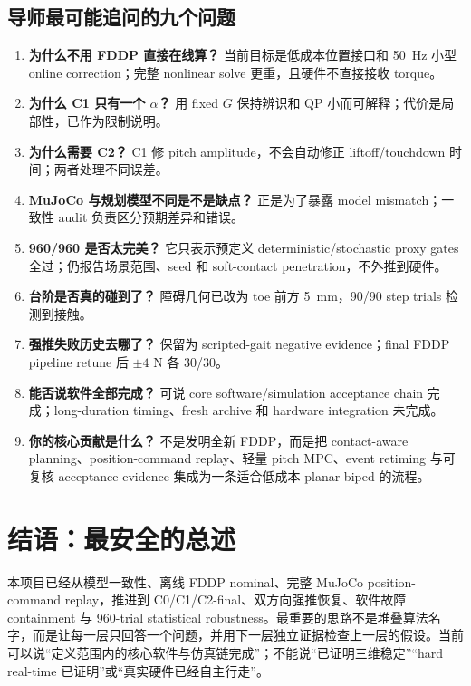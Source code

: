\documentclass[UTF8,11pt,a4paper]{ctexart}
\begin{document}
\subsection{导师最可能追问的九个问题}

\begin{enumerate}
 \item \textbf{为什么不用 FDDP 直接在线算？} 当前目标是低成本位置接口和 \SI{50}{Hz} 小型 online correction；完整 nonlinear solve 更重，且硬件不直接接收 torque。
 \item \textbf{为什么 C1 只有一个 $\alpha$？} 用 fixed $G$ 保持辨识和 QP 小而可解释；代价是局部性，已作为限制说明。
 \item \textbf{为什么需要 C2？} C1 修 pitch amplitude，不会自动修正 liftoff/touchdown 时间；两者处理不同误差。
 \item \textbf{MuJoCo 与规划模型不同是不是缺点？} 正是为了暴露 model mismatch；一致性 audit 负责区分预期差异和错误。
 \item \textbf{960/960 是否太完美？} 它只表示预定义 deterministic/stochastic proxy gates 全过；仍报告场景范围、seed 和 soft-contact penetration，不外推到硬件。
 \item \textbf{台阶是否真的碰到了？} 障碍几何已改为 toe 前方 \SI{5}{mm}，90/90 step trials 检测到接触。
 \item \textbf{强推失败历史去哪了？} 保留为 scripted-gait negative evidence；final FDDP pipeline retune 后 $\pm4$ N 各 30/30。
 \item \textbf{能否说软件全部完成？} 可说 core software/simulation acceptance chain 完成；long-duration timing、fresh archive 和 hardware integration 未完成。
 \item \textbf{你的核心贡献是什么？} 不是发明全新 FDDP，而是把 contact-aware planning、position-command replay、轻量 pitch MPC、event retiming 与可复核 acceptance evidence 集成为一条适合低成本 planar biped 的流程。
\end{enumerate}

\section{结语：最安全的总述}

本项目已经从模型一致性、离线 FDDP nominal、完整 MuJoCo position-command replay，推进到 C0/C1/C2-final、双方向强推恢复、软件故障 containment 与 960-trial statistical robustness。最重要的思路不是堆叠算法名字，而是让每一层只回答一个问题，并用下一层独立证据检查上一层的假设。当前可以说“定义范围内的核心软件与仿真链完成”；不能说“已证明三维稳定”“hard real-time 已证明”或“真实硬件已经自主行走”。
\end{document}
